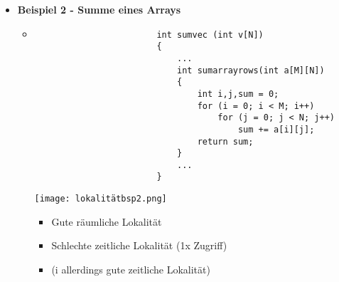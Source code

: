 \begin{itemize}
        \item \textbf{Beispiel 2 - Summe eines Arrays}
            \begin{itemize}
                \item[]
                    \begin{minipage}{0.35\textwidth}
                        \begin{verbatim}
                        int sumvec (int v[N])
                        {
                            ...
                            int sumarrayrows(int a[M][N])
                            {
                                int i,j,sum = 0;
                                for (i = 0; i < M; i++)
                                    for (j = 0; j < N; j++)
                                        sum += a[i][j];
                                return sum;
                            }
                            ...
                        }
                        \end{verbatim}
                    \end{minipage}
                    \begin{minipage}{0.5\textwidth}
                        \texttt{[image: lokalitätbsp2.png]}
                        \begin{itemize}
                            \item Gute räumliche Lokalität
                            \item Schlechte zeitliche Lokalität (1x Zugriff)
                            \item (i allerdings gute zeitliche Lokalität)
                        \end{itemize}
                    \end{minipage}
            \end{itemize}

\pagebreak


\end{itemize}
